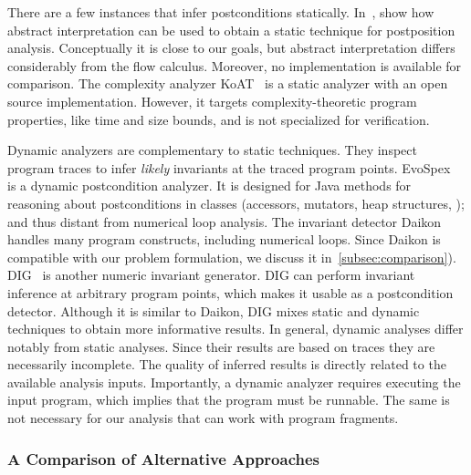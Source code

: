 There are a few instances that infer postconditions statically.
In~\cite{popeea2006}, show how abstract interpretation can be used to obtain a static technique for postposition analysis.
Conceptually it is close to our goals, but abstract interpretation differs considerably from the flow calculus.
Moreover, no implementation is available for comparison.
The complexity analyzer KoAT~\cite{giesl2022} is a static analyzer with an open source implementation.
However, it targets complexity-theoretic program properties, like time and size bounds, and is not specialized for verification.

Dynamic analyzers are complementary to static techniques.
They inspect program traces to infer \emph{likely} invariants at the traced program points.
EvoSpex~\cite{molina2021} is a dynamic postcondition analyzer.
It is designed for Java methods for reasoning about postconditions in classes (accessors, mutators, heap structures, \etc);
and thus distant from numerical loop analysis.
The invariant detector Daikon~\cite{ernst2007} handles many program constructs, including numerical loops.
Since Daikon is compatible with our problem formulation, we discuss it in~\autoref{subsec:comparison}).
DIG~\cite{nguyen2014} is another numeric invariant generator.
DIG can perform invariant inference at arbitrary program points, which makes it usable as a postcondition detector.
Although it is similar to Daikon, DIG mixes static and dynamic techniques to obtain more informative results.
In general, dynamic analyses differ notably from static analyses.
Since their results are based on traces they are necessarily incomplete.
The quality of inferred results is directly related to the available analysis inputs.
Importantly, a dynamic analyzer requires executing the input program, which implies that the program must be runnable.
The same is not necessary for our analysis that can work with program fragments.

\subsubsection{A Comparison of Alternative Approaches}
\label{subsec:comparison}

